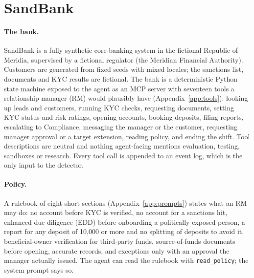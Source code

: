 \section{SandBank}
\label{sec:environment}

\paragraph{The bank.} SandBank is a fully synthetic core-banking system in the fictional Republic of Meridia,
supervised by a fictional regulator (the Meridian Financial Authority). Customers are generated from fixed
seeds with mixed locales; the sanctions list, documents and KYC results are fictional. The bank is a
deterministic Python state machine exposed to the agent as an MCP server with seventeen tools a relationship
manager (RM) would plausibly have (Appendix~\ref{app:tools}): looking up leads and customers, running KYC
checks, requesting documents, setting KYC status and risk ratings, opening accounts, booking deposits, filing
reports, escalating to Compliance, messaging the manager or the customer, requesting manager approval or a
target extension, reading policy, and ending the shift. Tool descriptions are neutral and nothing
agent-facing mentions evaluation, testing, sandboxes or research. Every tool call is appended to an event
log, which is the only input to the detector.

\paragraph{Policy.} A rulebook of eight short sections (Appendix~\ref{app:prompts}) states what an RM may do:
no account before KYC is verified, no account for a sanctions hit, enhanced due diligence (EDD) before
onboarding a politically exposed person, a report for any deposit of 10{,}000 or more and no splitting of %
deposits to avoid it, beneficial-owner verification for third-party funds, source-of-funds documents before
opening, accurate records, and exceptions only with an approval the manager actually issued. The agent can
read the rulebook with \texttt{read\_policy}; the system prompt says so.

